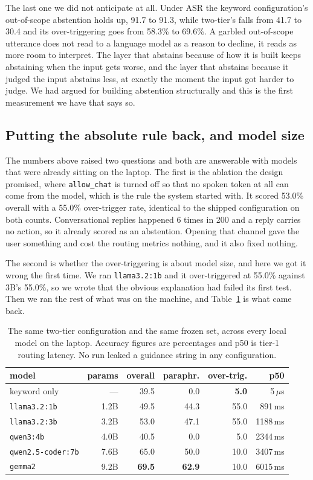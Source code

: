 \documentclass[sigconf,nonacm]{acmart}
\newcommand{\tool}[1]{\texttt{#1}}
\begin{document}
The last one we did not anticipate at all. Under ASR the keyword
configuration's out-of-scope abstention holds up, 91.7 to 91.3, while two-tier's
falls from 41.7 to 30.4 and its over-triggering goes from 58.3\% to 69.6\%. A
garbled out-of-scope utterance does not read to a language model as a reason to
decline, it reads as more room to interpret. The layer that abstains because of
how it is built keeps abstaining when the input gets worse, and the layer that
abstains because it judged the input abstains less, at exactly the moment the
input got harder to judge. We had argued for building abstention structurally
and this is the first measurement we have that says so.

\subsection{Putting the absolute rule back, and model size}
\label{sec:ablation}

The numbers above raised two questions and both are answerable with models that
were already sitting on the laptop. The first is the ablation the design
promised, where \tool{allow\_chat} is turned off so that no spoken token at all
can come from the model, which is the rule the system started with. It scored
53.0\% overall with a 55.0\% over-trigger rate, identical to the shipped
configuration on both counts. Conversational replies happened 6 times in 200 and
a reply carries no action, so it already scored as an abstention. Opening that
channel gave the user something and cost the routing metrics nothing, and it
also fixed nothing.

The second is whether the over-triggering is about model size, and here we got
it wrong the first time. We ran \tool{llama3.2:1b} and it over-triggered at
55.0\% against 3B's 55.0\%, so we wrote that the obvious explanation had failed
its first test. Then we ran the rest of what was on the machine, and
Table~\ref{tab:models} is what came back.

\begin{table}[t]
\caption{The same two-tier configuration and the same frozen set, across every
local model on the laptop. Accuracy figures are percentages and p50 is tier-1
routing latency. No run leaked a guidance string in any configuration.}
\label{tab:models}
\small
\begin{tabular}{lrrrrr}
\toprule
model & params & overall & paraphr. & over-trig. & p50 \\
\midrule
keyword only      & ---   & 39.5 & 0.0  & \textbf{5.0}  & 5\,$\mu$s \\
\tool{llama3.2:1b}& 1.2B  & 49.5 & 44.3 & 55.0 & 891\,ms \\
\tool{llama3.2:3b}& 3.2B  & 53.0 & 47.1 & 55.0 & 1188\,ms \\
\tool{qwen3:4b}   & 4.0B  & 40.5 & 0.0  & 5.0  & 2344\,ms \\
\tool{qwen2.5-coder:7b} & 7.6B & 65.0 & 50.0 & 10.0 & 3407\,ms \\
\tool{gemma2}     & 9.2B  & \textbf{69.5} & \textbf{62.9} & 10.0 & 6015\,ms \\
\bottomrule
\end{tabular}
\end{table}
\end{document}
